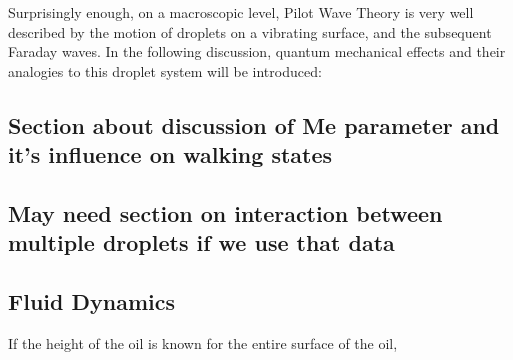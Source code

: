 Surprisingly enough, on a macroscopic level, Pilot Wave Theory is very well described by the motion of droplets on a vibrating surface, and the subsequent Faraday waves. In the following discussion, quantum mechanical effects and their analogies to this droplet system will be introduced:

\subsection{Section about discussion of Me parameter and it's influence on walking states}

\subsection{May need section on interaction between multiple droplets if we use that data}

\subsection{Fluid Dynamics}
If the height of the oil is known for the entire surface of the oil, 